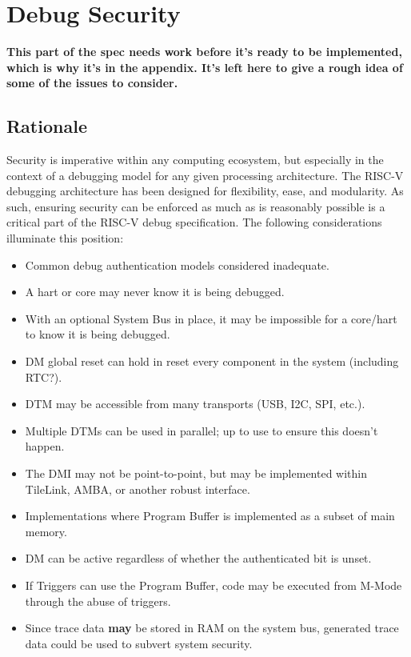 \chapter{Debug Security}

{\bf This part of the spec needs work before it's ready to be implemented,
which is why it's in the appendix. It's left here to give a rough idea of some
of the issues to consider.}

\section{Rationale}

Security is imperative within any computing ecosystem, but especially in the context of a debugging model for any given processing architecture. The RISC-V debugging architecture has been designed for flexibility, ease, and modularity. As such, ensuring security can be enforced as much as is reasonably possible is a critical part of the RISC-V debug specification. The following considerations illuminate this position:
\begin{itemize}
    \item Common debug authentication models considered inadequate.
    \item A hart or core may never know it is being debugged.
    \item With an optional System Bus in place, it may be impossible for a core/hart to know it is being debugged.
    \item DM global reset can hold in reset every component in the system (including RTC?).
    \item DTM may be accessible from many transports (USB, I2C, SPI, etc.).
    \item Multiple DTMs can be used in parallel; up to use to ensure this doesn't happen.
    \item The DMI may not be point-to-point, but may be implemented within TileLink, AMBA, or another robust interface.
    \item Implementations where Program Buffer is implemented as a subset of main memory.
    \item DM can be active regardless of whether the authenticated bit is unset.
    \item If Triggers can use the Program Buffer, code may be executed from M-Mode through the abuse of triggers.
    \item Since trace data {\bf may} be stored in RAM on the system bus, generated trace data could be used to subvert system security.
\end{itemize}

